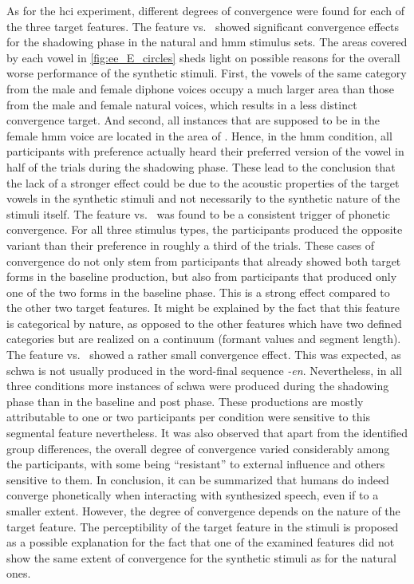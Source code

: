 As for the \ac{hci} experiment, different degrees of convergence were found for each of the three target features.
The feature \textipa{[E:]} vs.\ \textipa{[e:]} showed significant convergence effects for the shadowing phase in the natural and \ac{hmm} stimulus sets.
The areas covered by each vowel in \cref{fig:ee_E_circles} sheds light on possible reasons for the overall worse performance of the synthetic stimuli.
First, the vowels of the same category from the male and female diphone voices occupy a much larger area than those from the male and female natural voices, which results in a less distinct convergence target.
And second, all instances that are supposed to be \textipa{[E:]} in the female \ac{hmm} voice are located in the area of \textipa{[e:]}.
Hence, in the \ac{hmm} condition, all participants with preference \textipa{[e:]} actually heard their preferred version of the vowel in half of the trials during the shadowing phase.
These lead to the conclusion that the lack of a stronger effect could be due to the acoustic properties of the target vowels in the synthetic stimuli and not necessarily to the synthetic nature of the stimuli itself.
The feature \textipa{[I\c{c}]} vs.\ \textipa{[Ik]} was found to be a consistent trigger of phonetic convergence.
For all three stimulus types, the participants produced the opposite variant than their preference in roughly a third of the trials.
These cases of convergence do not only stem from participants that already showed both target forms in the baseline production, but also from participants that produced only one of the two forms in the baseline phase.
This is a strong effect compared to the other two target features.
It might be explained by the fact that this feature is categorical by nature, as opposed to the other features which have two defined categories but are realized on a continuum (formant values and segment length).
The feature \textipa{[\s{n}]} vs.\ \textipa{[@n]} showed a rather small convergence effect.
This was expected, as schwa is not usually produced in the word-final sequence \textit{-en}.
Nevertheless, in all three conditions more instances of schwa were produced during the shadowing phase than in the baseline and post phase.
These productions are mostly attributable to one or two participants per condition were sensitive to this segmental feature nevertheless.
It was also observed that apart from the identified group differences, the overall degree of convergence varied considerably among the participants, with some being \enquote{resistant} to external influence and others sensitive to them.
In conclusion, it can be summarized that humans do indeed converge phonetically when interacting with synthesized speech, even if to a smaller extent.
However, the degree of convergence depends on the nature of the target feature.
The perceptibility of the target feature in the stimuli is proposed as a possible explanation for the fact that one of the examined features did not show the same extent of convergence for the synthetic stimuli as for the natural ones.


